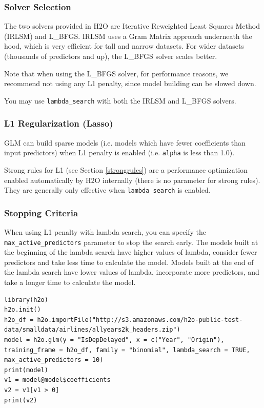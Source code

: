 \subsubsection{Solver Selection}

The two solvers provided in H2O are Iterative Reweighted Least Squares Method (IRLSM) and L\_BFGS.  IRLSM uses
a Gram Matrix approach underneath the hood, which is very efficient for tall and narrow datasets.  For wider 
datasets (thousands of predictors and up), the L\_BFGS solver scales better.

Note that when using the L\_BFGS solver, for performance reasons, we recommend not using any L1 penalty, since
model building can be slowed down.

You may use \texttt{lambda\_search} with both the IRLSM and L\_BFGS solvers.

\subsubsection{L1 Regularization (Lasso)}

GLM can build sparse models (i.e. models which have fewer coefficients than input predictors) when L1 penalty is
enabled (i.e. \texttt{alpha} is less than 1.0).

Strong rules for L1 (see Section \ref{strongrules}) are a performance optimization enabled automatically by H2O
internally (there is no parameter for strong rules).  They are generally only effective when
\texttt{lambda\_search} is enabled.

\subsubsection{Stopping Criteria}

When using L1 penalty with lambda search, you can specify the \texttt{max\_active\_predictors} parameter to stop
the search early.  The models built at the beginning of the lambda search have higher values of lambda, consider
fewer predictors and take less time to calculate the model.  Models built at the end of the lambda search have
lower values of lambda, incorporate more predictors, and take a longer time to calculate the model.

\bigskip
\waterExampleInR
\begin{lstlisting}[style=R]
library(h2o)
h2o.init()
h2o_df = h2o.importFile("http://s3.amazonaws.com/h2o-public-test-data/smalldata/airlines/allyears2k_headers.zip")
model = h2o.glm(y = "IsDepDelayed", x = c("Year", "Origin"), training_frame = h2o_df, family = "binomial", lambda_search = TRUE, max_active_predictors = 10)
print(model)
v1 = model@model$coefficients
v2 = v1[v1 > 0]
print(v2)
\end{lstlisting}


